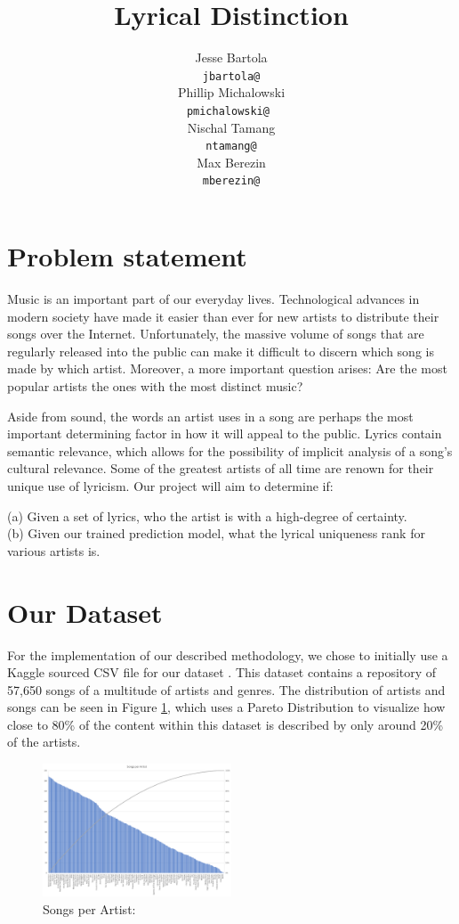 \documentclass[11pt,a4paper]{article}
\title{Lyrical Distinction}
\author{Jesse Bartola \\
      {\tt jbartola@} \\\And
      Phillip Michalowski \\
      {\tt pmichalowski@ } \\\And
      Nischal Tamang \\
      {\tt ntamang@} \\\And
      Max Berezin \\
      {\tt mberezin@} \\}
\date{}
\begin{document}
    \maketitle
    
    \section{Problem statement}
    Music is an important part of our everyday lives. Technological advances in modern society have made it easier than ever for new artists to distribute their songs over the Internet. Unfortunately, the massive volume of songs that are regularly released into the public can make it difficult to discern which song is made by which artist. Moreover, a more important question arises: Are the most popular artists the ones with the most distinct music?

Aside from sound, the words an artist uses in a song are perhaps the most important determining factor in how it will appeal to the public. Lyrics contain semantic relevance, which allows for the possibility of implicit analysis of a song’s cultural relevance. Some of the greatest artists of all time are renown for their unique use of lyricism. Our project will aim to determine if:
\begin{center}
\small{
(a) Given a set of lyrics, who the artist is with a high-degree of certainty.
\\
(b) Given our trained prediction model, what the lyrical uniqueness rank for various artists is.
}
\end{center}

    
    \section{Our Dataset}
For the implementation of our described methodology, we chose to initially use a Kaggle sourced CSV file for our dataset . This dataset contains a repository of 57,650 songs of a multitude of artists and genres. The distribution of artists and songs can be seen in Figure \ref{fig:songs_per_artist_I}, which uses a Pareto Distribution to visualize how close to 80\%  of the content within this dataset is described by only around 20\% of the artists. 

\begin{figure}[t]
    \centering
    \includegraphics[width=0.5\textwidth]{figs/songs_per_artist_I.png}
    \caption{Songs per Artist: }
    \label{fig:songs_per_artist_I}
\end{figure}
\end{document}
